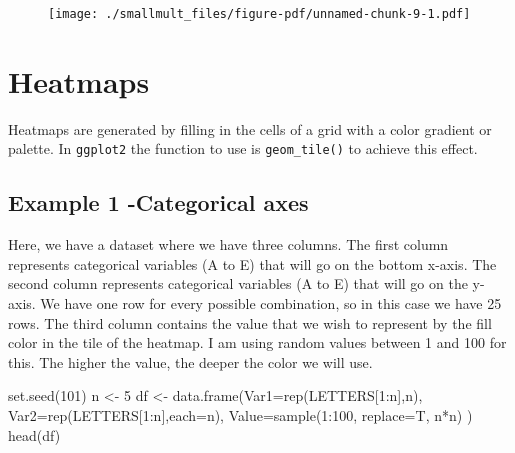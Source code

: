 \documentclass[
  letterpaper,
  DIV=11,
  numbers=noendperiod]{scrreprt}
\newenvironment{Shaded}{\begin{snugshade}}{\end{snugshade}}
\newcommand{\AttributeTok}[1]{\textcolor[rgb]{0.40,0.45,0.13}{#1}}
\newcommand{\DecValTok}[1]{\textcolor[rgb]{0.68,0.00,0.00}{#1}}
\newcommand{\FunctionTok}[1]{\textcolor[rgb]{0.28,0.35,0.67}{#1}}
\newcommand{\NormalTok}[1]{\textcolor[rgb]{0.00,0.23,0.31}{#1}}
\newcommand{\OtherTok}[1]{\textcolor[rgb]{0.00,0.23,0.31}{#1}}
\newcommand{\SpecialCharTok}[1]{\textcolor[rgb]{0.37,0.37,0.37}{#1}}
\begin{document}
\begin{figure}[H]

{\centering \texttt{[image: ./smallmult\_files/figure-pdf/unnamed-chunk-9-1.pdf]}

}

\end{figure}


\hypertarget{heatmaps}{%
\chapter{Heatmaps}\label{heatmaps}}

Heatmaps are generated by filling in the cells of a grid with a color
gradient or palette. In \texttt{ggplot2} the function to use is
\texttt{geom\_tile()} to achieve this effect.

\hypertarget{example-1--categorical-axes}{%
\section{\texorpdfstring{\textbf{Example 1 -Categorical
axes}}{Example 1 -Categorical axes}}\label{example-1--categorical-axes}}

Here, we have a dataset where we have three columns. The first column
represents categorical variables (A to E) that will go on the bottom
x-axis. The second column represents categorical variables (A to E) that
will go on the y-axis. We have one row for every possible combination,
so in this case we have 25 rows. The third column contains the value
that we wish to represent by the fill color in the tile of the heatmap.
I am using random values between 1 and 100 for this. The higher the
value, the deeper the color we will use.

\begin{Shaded}
\begin{Highlighting}[]
\FunctionTok{set.seed}\NormalTok{(}\DecValTok{101}\NormalTok{)}
\NormalTok{n }\OtherTok{\textless{}{-}} \DecValTok{5}
\NormalTok{df }\OtherTok{\textless{}{-}} \FunctionTok{data.frame}\NormalTok{(}\AttributeTok{Var1=}\FunctionTok{rep}\NormalTok{(LETTERS[}\DecValTok{1}\SpecialCharTok{:}\NormalTok{n],n),}
                 \AttributeTok{Var2=}\FunctionTok{rep}\NormalTok{(LETTERS[}\DecValTok{1}\SpecialCharTok{:}\NormalTok{n],}\AttributeTok{each=}\NormalTok{n),}
                 \AttributeTok{Value=}\FunctionTok{sample}\NormalTok{(}\DecValTok{1}\SpecialCharTok{:}\DecValTok{100}\NormalTok{, }\AttributeTok{replace=}\NormalTok{T, n}\SpecialCharTok{*}\NormalTok{n)}
\NormalTok{)}
\FunctionTok{head}\NormalTok{(df)}
\end{Highlighting}
\end{Shaded}
\end{document}
